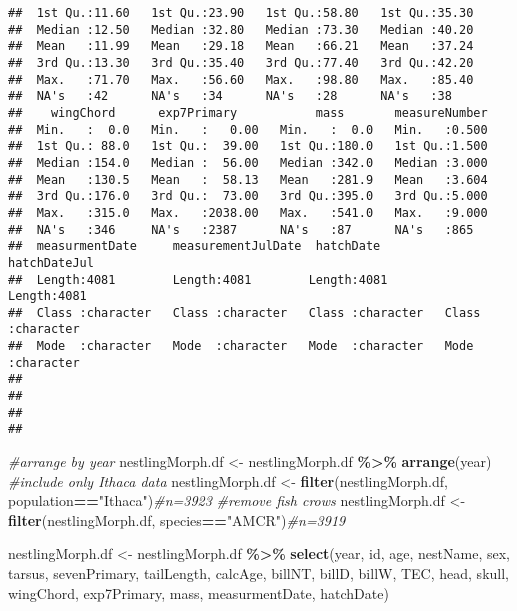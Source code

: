 \documentclass[
]{article}
\newenvironment{Shaded}{\begin{snugshade}}{\end{snugshade}}
\newcommand{\CommentTok}[1]{\textcolor[rgb]{0.56,0.35,0.01}{\textit{#1}}}
\newcommand{\FunctionTok}[1]{\textcolor[rgb]{0.13,0.29,0.53}{\textbf{#1}}}
\newcommand{\NormalTok}[1]{#1}
\newcommand{\OtherTok}[1]{\textcolor[rgb]{0.56,0.35,0.01}{#1}}
\newcommand{\SpecialCharTok}[1]{\textcolor[rgb]{0.81,0.36,0.00}{\textbf{#1}}}
\newcommand{\StringTok}[1]{\textcolor[rgb]{0.31,0.60,0.02}{#1}}
\begin{document}
\begin{verbatim}
##  1st Qu.:11.60   1st Qu.:23.90   1st Qu.:58.80   1st Qu.:35.30  
##  Median :12.50   Median :32.80   Median :73.30   Median :40.20  
##  Mean   :11.99   Mean   :29.18   Mean   :66.21   Mean   :37.24  
##  3rd Qu.:13.30   3rd Qu.:35.40   3rd Qu.:77.40   3rd Qu.:42.20  
##  Max.   :71.70   Max.   :56.60   Max.   :98.80   Max.   :85.40  
##  NA's   :42      NA's   :34      NA's   :28      NA's   :38     
##    wingChord      exp7Primary           mass       measureNumber  
##  Min.   :  0.0   Min.   :   0.00   Min.   :  0.0   Min.   :0.500  
##  1st Qu.: 88.0   1st Qu.:  39.00   1st Qu.:180.0   1st Qu.:1.500  
##  Median :154.0   Median :  56.00   Median :342.0   Median :3.000  
##  Mean   :130.5   Mean   :  58.13   Mean   :281.9   Mean   :3.604  
##  3rd Qu.:176.0   3rd Qu.:  73.00   3rd Qu.:395.0   3rd Qu.:5.000  
##  Max.   :315.0   Max.   :2038.00   Max.   :541.0   Max.   :9.000  
##  NA's   :346     NA's   :2387      NA's   :87      NA's   :865    
##  measurmentDate     measurementJulDate  hatchDate         hatchDateJul      
##  Length:4081        Length:4081        Length:4081        Length:4081       
##  Class :character   Class :character   Class :character   Class :character  
##  Mode  :character   Mode  :character   Mode  :character   Mode  :character  
##                                                                             
##                                                                             
##                                                                             
## 
\end{verbatim}

\begin{Shaded}
\begin{Highlighting}[]
\CommentTok{\#arrange by year}
\NormalTok{nestlingMorph.df }\OtherTok{\textless{}{-}}\NormalTok{ nestlingMorph.df }\SpecialCharTok{\%\textgreater{}\%} 
  \FunctionTok{arrange}\NormalTok{(year)}
\CommentTok{\#include only Ithaca data}
\NormalTok{nestlingMorph.df }\OtherTok{\textless{}{-}} \FunctionTok{filter}\NormalTok{(nestlingMorph.df, population}\SpecialCharTok{==}\StringTok{"Ithaca"}\NormalTok{)}\CommentTok{\#n=3923}
\CommentTok{\#remove fish crows}
\NormalTok{nestlingMorph.df }\OtherTok{\textless{}{-}} \FunctionTok{filter}\NormalTok{(nestlingMorph.df, species}\SpecialCharTok{==}\StringTok{"AMCR"}\NormalTok{)}\CommentTok{\#n=3919}
\end{Highlighting}
\end{Shaded}

\begin{Shaded}
\begin{Highlighting}[]
\NormalTok{nestlingMorph.df }\OtherTok{\textless{}{-}}\NormalTok{ nestlingMorph.df }\SpecialCharTok{\%\textgreater{}\%} 
  \FunctionTok{select}\NormalTok{(year, id, age, nestName, sex, tarsus, sevenPrimary, tailLength, calcAge, billNT, billD, billW, TEC, head, skull, wingChord, exp7Primary, mass, measurmentDate, hatchDate)}
\end{Highlighting}
\end{Shaded}
\end{document}
